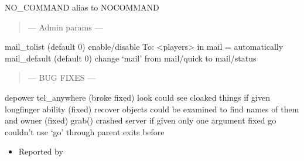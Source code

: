 \documentclass[letterpaper,10pt,english]{sphinxmanual}
\begin{document}
\sphinxAtStartPar
NO\_COMMAND alias to NOCOMMAND
\begin{quote}

\sphinxAtStartPar
— Admin params —
\end{quote}

\sphinxAtStartPar
mail\_tolist (default 0) \sphinxhyphen{} enable/disable To: \textless{}players\textgreater{} in mail =
automatically
mail\_default (default 0) \sphinxhyphen{} change ‘mail’ from mail/quick to mail/status
\begin{quote}

\sphinxAtStartPar
— BUG FIXES —
\end{quote}

\sphinxAtStartPar
depower \sphinxhyphen{} tel\_anywhere (broke \sphinxhyphen{} fixed)
look \sphinxhyphen{} could see cloaked things if given long\sphinxhyphen{}finger ability (fixed)
recover objects \sphinxhyphen{} could be examined to find names of them and owner (fixed)
grab() \sphinxhyphen{} crashed server if given only one argument \sphinxhyphen{} fixed
go \sphinxhyphen{} couldn’t use ‘go’ through parent exits before
\begin{itemize}
\item {} 
\sphinxAtStartPar
Reported by 

\end{itemize}
\end{document}
